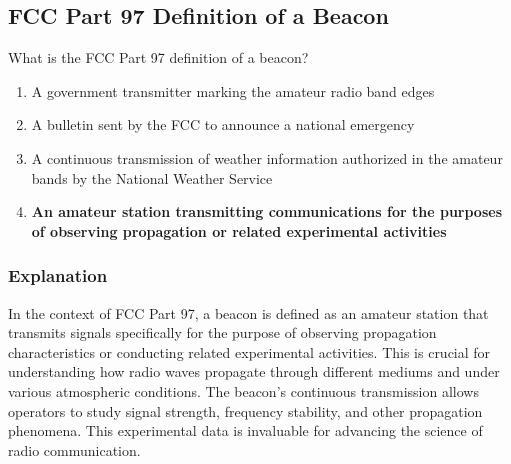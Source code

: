\subsection{FCC Part 97 Definition of a Beacon}
\label{T1A06}

\begin{tcolorbox}[colback=gray!10!white,colframe=black!75!black,title=T1A06]
What is the FCC Part 97 definition of a beacon?
\begin{enumerate}[label=\Alph*)]
    \item A government transmitter marking the amateur radio band edges
    \item A bulletin sent by the FCC to announce a national emergency
    \item A continuous transmission of weather information authorized in the amateur bands by the National Weather Service
    \item \textbf{An amateur station transmitting communications for the purposes of observing propagation or related experimental activities}
\end{enumerate}
\end{tcolorbox}

\subsubsection{Explanation}
In the context of FCC Part 97, a beacon is defined as an amateur station that transmits signals specifically for the purpose of observing propagation characteristics or conducting related experimental activities. This is crucial for understanding how radio waves propagate through different mediums and under various atmospheric conditions. The beacon's continuous transmission allows operators to study signal strength, frequency stability, and other propagation phenomena. This experimental data is invaluable for advancing the science of radio communication.

